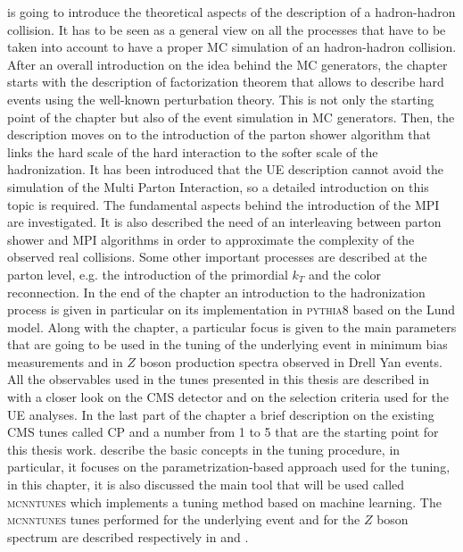 \medskip

 is going to introduce the theoretical aspects of the description of a hadron-hadron collision. It has to be seen as a general view on all the processes that have to be taken into account to have a proper MC simulation of an hadron-hadron collision. After an overall introduction on the idea behind the MC generators, the chapter starts with the description of factorization theorem that allows to describe hard events using the well-known perturbation theory. This is not only the starting point of the chapter but also of the event simulation in MC generators. Then, the description moves on to the introduction of the parton shower algorithm that links the hard scale of the hard interaction to the softer scale of the hadronization. It has been introduced that the UE description cannot avoid the simulation of the Multi Parton Interaction, so a detailed introduction on this topic is required. The fundamental aspects behind the introduction of the MPI are investigated. It is also described the need of an interleaving between parton shower and MPI algorithms in order to approximate the complexity of the observed real collisions.  Some other important processes are described at the parton level, e.g. the introduction of the primordial $k_T$ and the color reconnection. In the end of the chapter an introduction to the hadronization process is given in particular on its implementation in \textsc{pythia8} based on the Lund model. 
Along with the chapter, a particular focus is given to the main parameters that are going to be used in the tuning of the underlying event in minimum bias measurements and in $Z$ boson production spectra observed in Drell Yan events. All the observables used in the tunes presented in this thesis are described in  with a closer look on the CMS detector and on the selection criteria used for the UE analyses. In the last part of the chapter a brief description on the existing CMS tunes called CP and a number from 1 to 5 \cite{CPtunes} that are the starting point for this thesis work.  describe the basic concepts in the tuning procedure, in particular, it focuses on the parametrization-based approach used for the tuning, in this chapter, it is also discussed the main tool that will be used called \textsc{mcnntunes} \cite{MCNNTUNESarticle} which implements a tuning method based on machine learning. The \textsc{mcnntunes} tunes performed for the underlying event and for the $Z$ boson spectrum are described respectively in  and .
 
